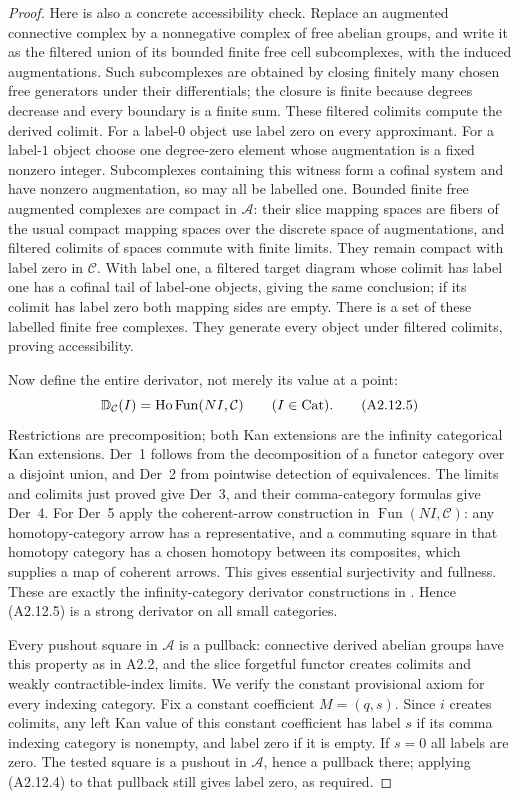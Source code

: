 \begin{proof}
Here is also a concrete accessibility check. Replace an augmented
connective complex by a nonnegative complex of free abelian groups, and
write it as the filtered union of its bounded finite free cell
subcomplexes, with the induced augmentations. Such subcomplexes are
obtained by closing finitely many chosen free generators under their
differentials; the closure is finite because degrees decrease and every
boundary is a finite sum. These filtered colimits compute the derived
colimit. For a label-$0$ object use label zero on every approximant.
For a label-$1$ object choose one degree-zero element whose augmentation
is a fixed nonzero integer. Subcomplexes containing this witness form
a cofinal system and have nonzero augmentation, so may all be labelled
one. Bounded finite free augmented complexes are compact in $\mathcal A$:
their slice mapping spaces are fibers of the usual compact mapping
spaces over the discrete space of augmentations, and filtered colimits
of spaces commute with finite limits. They remain compact with label
zero in $\mathcal C$. With label one, a filtered target diagram whose
colimit has label one has a cofinal tail of label-one objects, giving
the same conclusion; if its colimit has label zero both mapping sides
are empty. There is a set of these labelled finite free complexes.
They generate every object under filtered colimits, proving accessibility.

Now define the entire derivator, not merely its value at a point:
\[
 \mathbb D_{\mathcal C}(I)=
       \mathrm{Ho}\operatorname{Fun}(NI,\mathcal C)
       \qquad(I\in\mathrm{Cat}).
 \tag{A2.12.5}
\]
Restrictions are precomposition; both Kan extensions are the infinity
categorical Kan extensions. Der~1 follows from the decomposition of a
functor category over a disjoint union, and Der~2 from pointwise detection
of equivalences. The limits and colimits just proved give Der~3, and their
comma-category formulas give Der~4. For Der~5 apply the coherent-arrow
construction in $\operatorname{Fun}(NI,\mathcal C)$: any homotopy-category
arrow has a representative, and a commuting square in that homotopy
category has a chosen homotopy between its composites, which supplies a
map of coherent arrows. This gives essential surjectivity and fullness.
These are exactly the infinity-category derivator constructions in
\cite[Example~2.5 and the discussion of Der~5 on p.~5]{A2GrothPontoShulman}.
Hence (A2.12.5) is a strong derivator on all small categories.

Every pushout square in $\mathcal A$ is a pullback: connective derived
abelian groups have this property as in A2.2, and the slice forgetful
functor creates colimits and weakly contractible-index limits. We verify
the constant provisional axiom for every indexing category. Fix a constant
coefficient $M=(q,s)$. Since $i$ creates colimits, any left Kan value of
this constant coefficient has label $s$ if its comma indexing category is
nonempty, and label zero if it is empty. If $s=0$ all labels are zero.
The tested square is a pushout in $\mathcal A$, hence a pullback there;
applying (A2.12.4) to that pullback still gives label zero, as required.


\end{proof}
